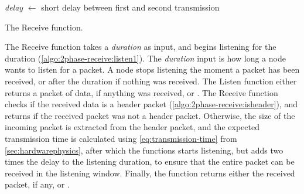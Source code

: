 \begin{algorithm}[ht]
    \DontPrintSemicolon
    \textit{delay} $\leftarrow$ short delay between first and second transmission\;
    \;

    \caption{The Receive function.}
    \label{algo:2phase-receive}
\end{algorithm}

The Receive function takes a \textit{duration} as input, and begins listening for the duration
(\autoref{algo:2phase-receive:listen1}). The \textit{duration} input is how long a node wants to listen for a
packet. A node stops listening the moment a packet has been received, or after the duration if nothing was
received. The Listen function either returns a packet of data, if anything was received, or \KwNull. The
Receive function checks if the received data is a header packet (\autoref{algo:2phase-receive:isheader}), and
returns \KwNull if the received packet was not a header packet. Otherwise, the size of the incoming packet is
extracted from the header packet, and the expected transmission time is calculated using
\autoref{eq:transmission-time} from \autoref{sec:hardwarephysics}, after which the functions starts listening,
but adds two times the delay to the listening duration, to ensure that the entire packet can be received in
the listening window. Finally, the function returns either the received packet, if any, or \KwNull.